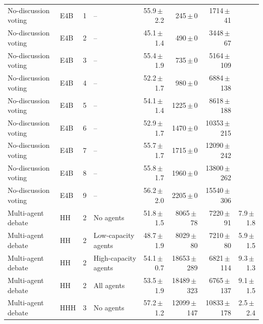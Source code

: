 \begin{table}[htbp]
\begin{tabular}{llclrrrr}
No-discussion voting & E4B & 1 & -- & 55.9{\scriptsize\,$\pm$\,2.2} & 245{\scriptsize\,$\pm$\,0} & 1714{\scriptsize\,$\pm$\,41} &  \\
No-discussion voting & E4B & 2 & -- & 45.1{\scriptsize\,$\pm$\,1.4} & 490{\scriptsize\,$\pm$\,0} & 3448{\scriptsize\,$\pm$\,67} &  \\
No-discussion voting & E4B & 3 & -- & 55.4{\scriptsize\,$\pm$\,1.9} & 735{\scriptsize\,$\pm$\,0} & 5164{\scriptsize\,$\pm$\,109} &  \\
No-discussion voting & E4B & 4 & -- & 52.2{\scriptsize\,$\pm$\,1.7} & 980{\scriptsize\,$\pm$\,0} & 6884{\scriptsize\,$\pm$\,138} &  \\
No-discussion voting & E4B & 5 & -- & 54.1{\scriptsize\,$\pm$\,1.4} & 1225{\scriptsize\,$\pm$\,0} & 8618{\scriptsize\,$\pm$\,188} &  \\
No-discussion voting & E4B & 6 & -- & 52.9{\scriptsize\,$\pm$\,1.7} & 1470{\scriptsize\,$\pm$\,0} & 10353{\scriptsize\,$\pm$\,215} &  \\
No-discussion voting & E4B & 7 & -- & 55.7{\scriptsize\,$\pm$\,1.7} & 1715{\scriptsize\,$\pm$\,0} & 12090{\scriptsize\,$\pm$\,242} &  \\
No-discussion voting & E4B & 8 & -- & 55.8{\scriptsize\,$\pm$\,1.7} & 1960{\scriptsize\,$\pm$\,0} & 13800{\scriptsize\,$\pm$\,262} &  \\
No-discussion voting & E4B & 9 & -- & 56.2{\scriptsize\,$\pm$\,2.0} & 2205{\scriptsize\,$\pm$\,0} & 15540{\scriptsize\,$\pm$\,306} &  \\
Multi-agent debate & HH & 2 & No agents & 51.8{\scriptsize\,$\pm$\,1.5} & 8065{\scriptsize\,$\pm$\,78} & 7220{\scriptsize\,$\pm$\,91} & 7.9{\scriptsize\,$\pm$\,1.8} \\
Multi-agent debate & HH & 2 & Low-capacity agents & 48.7{\scriptsize\,$\pm$\,1.9} & 8029{\scriptsize\,$\pm$\,80} & 7210{\scriptsize\,$\pm$\,80} & 5.9{\scriptsize\,$\pm$\,1.5} \\
Multi-agent debate & HH & 2 & High-capacity agents & 54.1{\scriptsize\,$\pm$\,0.7} & 18653{\scriptsize\,$\pm$\,289} & 6821{\scriptsize\,$\pm$\,114} & 9.3{\scriptsize\,$\pm$\,1.3} \\
Multi-agent debate & HH & 2 & All agents & 53.5{\scriptsize\,$\pm$\,1.9} & 18489{\scriptsize\,$\pm$\,323} & 6765{\scriptsize\,$\pm$\,137} & 9.1{\scriptsize\,$\pm$\,1.5} \\
Multi-agent debate & HHH & 3 & No agents & 57.2{\scriptsize\,$\pm$\,1.2} & 12099{\scriptsize\,$\pm$\,147} & 10833{\scriptsize\,$\pm$\,178} & 2.5{\scriptsize\,$\pm$\,2.4} \\

\end{tabular}
\end{table}
